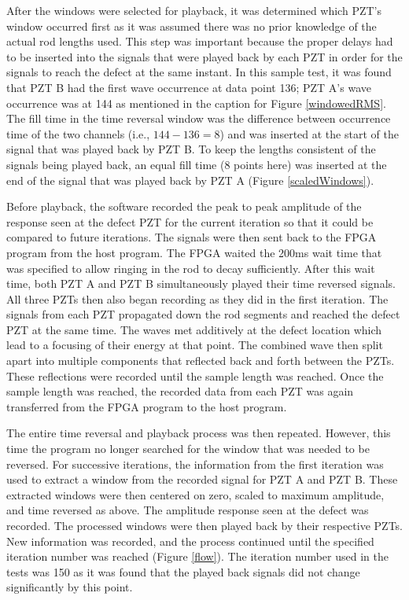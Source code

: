 \documentclass[11pt,letterpaper]{article}%
\begin{document}
After the windows were selected for playback, it was determined which PZT's window occurred first as it was assumed there was no prior knowledge of the actual rod lengths used. This step was important because the proper delays had to be inserted into the signals that were played back by each PZT in order for the signals to reach the defect at the same instant. In this sample test, it was found that PZT B had the first wave occurrence at data point 136; PZT A's wave occurrence was at 144 as mentioned in the caption for Figure \ref{windowedRMS}. The fill time in the time reversal window was the difference between occurrence time of the two channels (i.e., $ 144 - 136 = 8$) and was inserted at the start of the signal that was played back by PZT B. To keep the lengths consistent of the signals being played back, an equal fill time (8 points here) was inserted at the end of the signal that was played back by PZT A (Figure \ref{scaledWindows}).

Before playback, the software recorded the peak to peak amplitude of the response seen at the defect PZT for the current iteration so that it could be compared to future iterations. The signals were then sent back to the FPGA program from the host program. The FPGA waited the 200ms wait time that was specified to allow ringing in the rod to decay sufficiently. After this wait time, both PZT A and PZT B simultaneously played their time reversed signals. All three PZTs then also began recording as they did in the first iteration. The signals from each PZT propagated down the rod segments and reached the defect PZT at the same time. The waves met additively at the defect location which lead to a focusing of their energy at that point. The combined wave then split apart into multiple components that reflected back and forth between the PZTs. These reflections were recorded until the sample length was reached. Once the sample length was reached, the recorded data from each PZT was again transferred from the FPGA program to the host program. 

The entire time reversal and playback process was then repeated. However, this time the program no longer searched for the window that was needed to be reversed. For successive iterations, the information from the first iteration was used to extract a window from the recorded signal for PZT A and PZT B. These extracted windows were then centered on zero, scaled to maximum amplitude, and time reversed as above. The amplitude response seen at the defect was recorded. The processed windows were then played back by their respective PZTs. New information was recorded, and the process continued until the specified iteration number was reached (Figure \ref{flow}). The iteration number used in the tests was 150 as it was found that the played back signals did not change significantly by this point.
\end{document}

